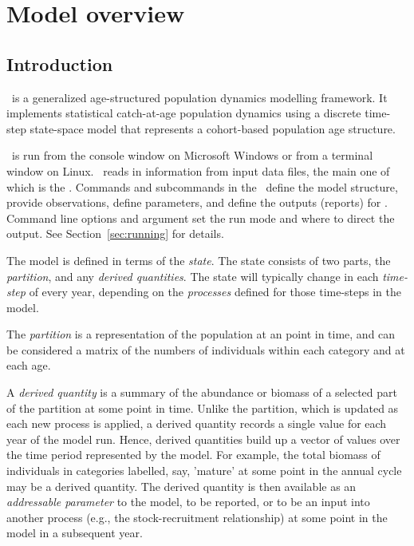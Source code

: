 \section{Model overview\label{sec:overview}}

\subsection{Introduction}

\CNAME\ is a generalized age-structured population dynamics modelling framework. It implements statistical catch-at-age population dynamics using a discrete time-step state-space model that represents a cohort-based population age structure.  

\CNAME\ is run from the console window on Microsoft Windows or from a terminal window on Linux. \CNAME\ reads in information from input data files, the main one of which is the \emph{\config}. Commands and subcommands in the \config\ define the model structure, provide observations, define parameters, and define the outputs (reports) for \CNAME. Command line options and argument set the run mode and where to direct the output. See Section~\ref{sec:running} for details.

The model is defined in terms of the \emph{state}. The state consists of two parts, the \emph{partition}, and any \emph{derived quantities}. The state will typically change in each \emph{time-step} of every year, depending on the \emph{processes} defined for those time-steps in the model. 

The \emph{partition} is a representation of the population at an point in time, and can be considered a matrix of the numbers of individuals within each category and at each age. 

A \emph{derived quantity} is a summary of the abundance or biomass of a selected part of the partition at some point in time. Unlike the partition, which is updated as each new process is applied, a derived quantity records a single value for each year of the model run. Hence, derived quantities build up a vector of values over the time period represented by the model. For example, the total biomass of individuals in categories labelled, say, 'mature' at some point in the annual cycle may be a derived quantity. The derived quantity is then available as an \emph{addressable parameter} to the model, to be reported, or to be an input into another process (e.g., the stock-recruitment relationship) at some point in the model in a subsequent year. 

